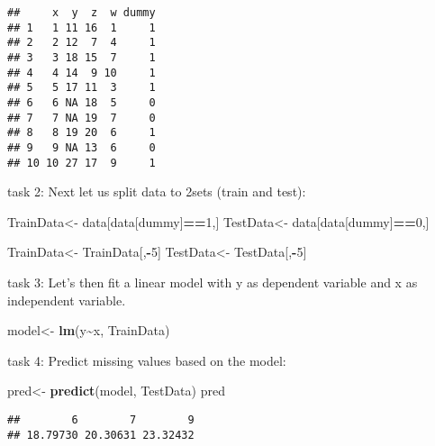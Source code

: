 \documentclass[
]{article}
\newenvironment{Shaded}{\begin{snugshade}}{\end{snugshade}}
\newcommand{\DecValTok}[1]{\textcolor[rgb]{0.00,0.00,0.81}{#1}}
\newcommand{\FunctionTok}[1]{\textcolor[rgb]{0.13,0.29,0.53}{\textbf{#1}}}
\newcommand{\NormalTok}[1]{#1}
\newcommand{\OtherTok}[1]{\textcolor[rgb]{0.56,0.35,0.01}{#1}}
\newcommand{\SpecialCharTok}[1]{\textcolor[rgb]{0.81,0.36,0.00}{\textbf{#1}}}
\newcommand{\StringTok}[1]{\textcolor[rgb]{0.31,0.60,0.02}{#1}}
\begin{document}
\begin{verbatim}
##     x  y  z  w dummy
## 1   1 11 16  1     1
## 2   2 12  7  4     1
## 3   3 18 15  7     1
## 4   4 14  9 10     1
## 5   5 17 11  3     1
## 6   6 NA 18  5     0
## 7   7 NA 19  7     0
## 8   8 19 20  6     1
## 9   9 NA 13  6     0
## 10 10 27 17  9     1
\end{verbatim}

task 2: Next let us split data to 2sets (train and test):

\begin{Shaded}
\begin{Highlighting}[]
\NormalTok{TrainData}\OtherTok{\textless{}{-}}\NormalTok{ data[data[}\StringTok{\textquotesingle{}dummy\textquotesingle{}}\NormalTok{]}\SpecialCharTok{==}\DecValTok{1}\NormalTok{,] }
\NormalTok{TestData}\OtherTok{\textless{}{-}}\NormalTok{ data[data[}\StringTok{\textquotesingle{}dummy\textquotesingle{}}\NormalTok{]}\SpecialCharTok{==}\DecValTok{0}\NormalTok{,]}

\NormalTok{TrainData}\OtherTok{\textless{}{-}}\NormalTok{ TrainData[,}\SpecialCharTok{{-}}\DecValTok{5}\NormalTok{] }
\NormalTok{TestData}\OtherTok{\textless{}{-}}\NormalTok{ TestData[,}\SpecialCharTok{{-}}\DecValTok{5}\NormalTok{] }
\end{Highlighting}
\end{Shaded}

task 3: Let's then fit a linear model with y as dependent variable and x
as independent variable.

\begin{Shaded}
\begin{Highlighting}[]
\NormalTok{model}\OtherTok{\textless{}{-}} \FunctionTok{lm}\NormalTok{(y}\SpecialCharTok{\textasciitilde{}}\NormalTok{x, TrainData) }
\end{Highlighting}
\end{Shaded}

task 4: Predict missing values based on the model:

\begin{Shaded}
\begin{Highlighting}[]
\NormalTok{pred}\OtherTok{\textless{}{-}} \FunctionTok{predict}\NormalTok{(model, TestData)  }
\NormalTok{pred }
\end{Highlighting}
\end{Shaded}

\begin{verbatim}
##        6        7        9 
## 18.79730 20.30631 23.32432
\end{verbatim}
\end{document}
